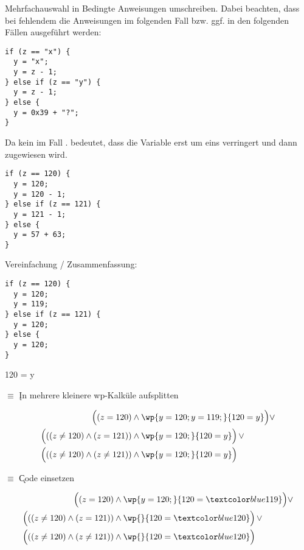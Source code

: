 \documentclass{bschlangaul-aufgabe}
\begin{document}
\begin{bAntwort}
Mehrfachauswahl in Bedingte Anweisungen umschreiben. Dabei beachten,
dass bei fehlendem  die Anweisungen im folgenden Fall
bzw. ggf. in den folgenden Fällen ausgeführt werden:

\begin{verbatim}
if (z == "x") {
  y = "x";
  y = z - 1;
} else if (z == "y") {
  y = z - 1;
} else {
  y = 0x39 + "?";
}
\end{verbatim}

\noindent
Da kein  im Fall .
 bedeutet, dass die Variable erst um eins verringert und
dann zugewiesen wird.

\begin{verbatim}
if (z == 120) {
  y = 120;
  y = 120 - 1;
} else if (z == 121) {
  y = 121 - 1;
} else {
  y = 57 + 63;
}
\end{verbatim}

\noindent
Vereinfachung / Zusammenfassung:

\begin{verbatim}
if (z == 120) {
  y = 120;
  y = 119;
} else if (z == 121) {
  y = 120;
} else {
  y = 120;
}
\end{verbatim}

{120 = y}

\bigskip

$\equiv$ \k{In mehrere kleinere wp-Kalküle aufsplitten}

\begin{align*}
\Bigl( (z = 120) & \land \wp{y=120;y=119;}{120 = y} \Bigr) \lor \\
\Bigl( ((z \neq 120) \land (z = 121)) & \land \wp{y=120;}{120 = y} \Bigr) \, \lor \\
\Bigl( ((z \neq 120) \land (z \neq 121)) & \land \wp{y=120;}{120 = y} \Bigr) \\
\end{align*}

$\equiv$ \k{Code einsetzen}

\begin{align*}
\Bigl( (z = 120) & \land \wp{y=120;}{120 = \m{119}} \Bigr) \lor \\
\Bigl( ((z \neq 120) \land (z = 121)) & \land \wp{}{120 = \m{120}} \Bigr) \, \lor \\
\Bigl( ((z \neq 120) \land (z \neq 121)) & \land \wp{}{120 = \m{120}} \Bigr) \\
\end{align*}


\end{bAntwort}
\end{document}
